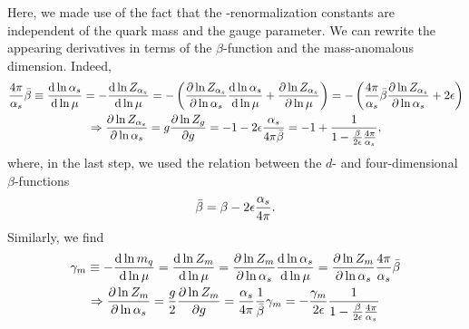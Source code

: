 Here, we made use of the fact that the \MS-renormalization constants are independent of the quark mass and the gauge parameter. We can rewrite the appearing derivatives in terms of the $\beta$-function and the mass-anomalous dimension. Indeed,
\begin{equation}
\begin{gathered}
\frac{4\pi}{\alpha_s} \bar{\beta} \equiv \frac{\mathrm{d} \ln \alpha_s}{\mathrm{d} \ln \mu} = - \frac{\mathrm{d} \ln Z_{\alpha_s}}{\mathrm{d} \ln \mu} = - \left( \frac{\partial \ln Z_{\alpha_s}}{\partial \ln \alpha_s} \frac{\mathrm{d} \ln \alpha_s}{\mathrm{d} \ln \mu} + \frac{\partial \ln Z_{\alpha_s}}{\partial \ln\mu} \right) = - \left(  \frac{4 \pi}{\alpha_s}\bar{\beta} \frac{\partial \ln Z_{\alpha_s}}{\partial \ln \alpha_s} + 2 \epsilon \right) \\
\Rightarrow \frac{\partial \ln Z_{\alpha_s}}{\partial \ln \alpha_s} = g \frac{\partial \ln Z_g}{\partial g} = - 1 - 2 \epsilon \frac{\alpha_s}{4 \pi\bar{\beta}} = -1 + \frac{1}{1 - \frac{\beta}{2 \epsilon} \frac{4 \pi}{\alpha_s}},
\end{gathered}
\end{equation}
where, in the last step, we used the relation between the $d$- and four-dimensional $\beta$-functions
\begin{equation}
\bar{\beta} = \beta - 2 \epsilon \frac{\alpha_s}{4 \pi}.
\label{eq:4:d_dimensional_beta_function}
\end{equation}
Similarly, we find
\begin{equation}
\begin{gathered}
\gamma_m \equiv - \frac{\mathrm{d} \ln m_q}{\mathrm{d} \ln \mu} = \frac{\mathrm{d} \ln Z_m}{\mathrm{d} \ln \mu} = \frac{\partial \ln Z_m}{\partial \ln \alpha_s} \frac{\mathrm{d} \ln \alpha_s}{\mathrm{d} \ln \mu} = \frac{\partial \ln Z_m}{\partial \ln \alpha_s} \frac{4 \pi}{\alpha_s} \bar{\beta} \\
\Rightarrow \frac{\partial \ln Z_m}{ \partial \ln \alpha_s} = \frac{g}{2} \frac{\partial \ln Z_m}{\partial g} = \frac{\alpha_s}{4 \pi} \frac{1}{\bar{\beta}} \gamma_m = - \frac{\gamma_m}{2 \epsilon} \frac{1}{1 - \frac{\beta}{2 \epsilon} \frac{4 \pi}{\alpha_s}}
\end{gathered}
\end{equation}

